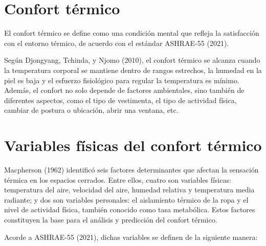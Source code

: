 \documentclass[
  letterpaper,
]{scrbook}
\begin{document}
\section{Confort térmico}\label{confort-tuxe9rmico}

El confort térmico se define como una condición mental que refleja la
satisfacción con el entorno térmico, de acuerdo con el estándar
ASHRAE-55 (2021).

Según Djongyang, Tchinda, y Njomo (2010), el confort térmico se alcanza
cuando la temperatura corporal se mantiene dentro de rangos estrechos,
la humedad en la piel es baja y el esfuerzo fisiológico para regular la
temperatura es mínimo. Además, el confort no solo depende de factores
ambientales, sino también de diferentes aspectos, como el tipo de
vestimenta, el tipo de actividad física, cambiar de postura o ubicación,
abrir una ventana, etc.

\section{Variables físicas del confort
térmico}\label{variables-fuxedsicas-del-confort-tuxe9rmico}

Macpherson (1962) identificó seis factores determinantes que afectan la
sensación térmica en los espacios cerrados. Entre ellos, cuatro son
variables físicas: temperatura del aire, velocidad del aire, humedad
relativa y temperatura media radiante; y dos son variables personales:
el aislamiento térmico de la ropa y el nivel de actividad física,
también conocido como tasa metabólica. Estos factores constituyen la
base para el análisis y predicción del confort térmico.

Acorde a ASHRAE-55 (2021), dichas variables se definen de la siguiente
manera:
\end{document}
